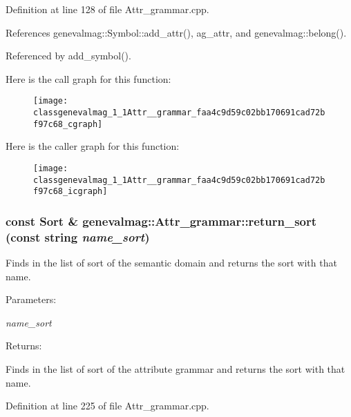 Definition at line 128 of file Attr\_\-grammar.cpp.

References genevalmag::Symbol::add\_\-attr(), ag\_\-attr, and genevalmag::belong().

Referenced by add\_\-symbol().

Here is the call graph for this function:\nopagebreak
\begin{figure}[H]
\begin{center}
\leavevmode
\texttt{[image: classgenevalmag\_1\_1Attr\_\_grammar\_faa4c9d59c02bb170691cad72bf97c68\_cgraph]}
\end{center}
\end{figure}


Here is the caller graph for this function:\nopagebreak
\begin{figure}[H]
\begin{center}
\leavevmode
\texttt{[image: classgenevalmag\_1\_1Attr\_\_grammar\_faa4c9d59c02bb170691cad72bf97c68\_icgraph]}
\end{center}
\end{figure}
\hypertarget{classgenevalmag_1_1Attr__grammar_cfa0b0a6876e33a4f6ab19afd073edf8}{
\subsubsection[{return\_\-sort}]{\setlength{\rightskip}{0pt plus 5cm}const {\bf Sort} \& genevalmag::Attr\_\-grammar::return\_\-sort (const string {\em name\_\-sort})}}
\label{classgenevalmag_1_1Attr__grammar_cfa0b0a6876e33a4f6ab19afd073edf8}


Finds in the list of sort of the semantic domain and returns the sort with that name. \begin{Desc}
\item[Parameters:]
\begin{description}
\item[{\em name\_\-sort}]\end{description}
\end{Desc}
\begin{Desc}
\item[Returns:]\end{Desc}
Finds in the list of sort of the attribute grammar and returns the sort with that name. 

Definition at line 225 of file Attr\_\-grammar.cpp.

